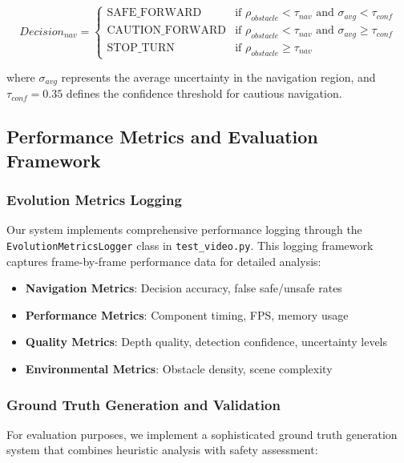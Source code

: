 \documentclass[12pt,oneside]{book}
\begin{document}
\begin{equation}
Decision_{nav} = \begin{cases}
\text{SAFE\_FORWARD} & \text{if } \rho_{obstacle} < \tau_{nav} \text{ and } \sigma_{avg} < \tau_{conf} \\
\text{CAUTION\_FORWARD} & \text{if } \rho_{obstacle} < \tau_{nav} \text{ and } \sigma_{avg} \geq \tau_{conf} \\
\text{STOP\_TURN} & \text{if } \rho_{obstacle} \geq \tau_{nav}
\end{cases}
\label{eq:navigation_decision_detailed}
\end{equation}

where $\sigma_{avg}$ represents the average uncertainty in the navigation region, and $\tau_{conf} = 0.35$ defines the confidence threshold for cautious navigation.

\subsection{Performance Metrics and Evaluation Framework}

\subsubsection{Evolution Metrics Logging}

Our system implements comprehensive performance logging through the \texttt{EvolutionMetricsLogger} class in \texttt{test\_video.py}. This logging framework captures frame-by-frame performance data for detailed analysis:

\begin{itemize}
\item \textbf{Navigation Metrics}: Decision accuracy, false safe/unsafe rates
\item \textbf{Performance Metrics}: Component timing, FPS, memory usage
\item \textbf{Quality Metrics}: Depth quality, detection confidence, uncertainty levels
\item \textbf{Environmental Metrics}: Obstacle density, scene complexity
\end{itemize}

\subsubsection{Ground Truth Generation and Validation}

For evaluation purposes, we implement a sophisticated ground truth generation system that combines heuristic analysis with safety assessment:
\end{document}
